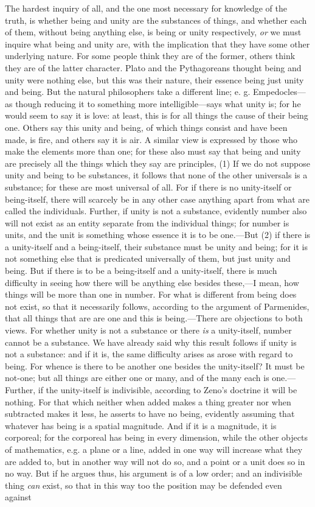 The hardest inquiry of all, and the one most necessary for knowledge of the truth, is whether being and unity are the substances of things, and whether each of them, without being anything else, is being or unity respectively, \emph{or} we must inquire what being and unity are, with the implication that they have some other underlying nature. For some people think they are of the former, others think they are of the latter character. Plato and the Pythagoreans thought being and unity were nothing else, but this was their nature, their essence being just unity and being. But the natural philosophers take a different line; e. g. Empedocles—as though reducing it to something more intelligible—says what unity is; for he would seem to say it is love: at least, this is for all things the cause of their being one. Others say this unity and being, of which things consist and have been made, is fire, and others say it is air. A similar view is expressed by those who make the elements more than one; for these also must say that being and unity are precisely all the things which they say are principles, (1) If we do not suppose unity and being to be substances, it follows that none of the other universals is a substance; for these are most universal of all. For if there is no unity-itself or being-itself, there will scarcely be in any other case anything apart from what are called the individuals. Further, if unity is not a substance, evidently number also will not exist as an entity separate from the individual things; for number is units, and the unit is something whose essence it is to be one.—But (2) if there is a unity-itself and a being-itself, their substance must be unity and being; for it is not something else that is predicated universally of them, but just unity and being. But if there is to be a being-itself and a unity-itself, there is much difficulty in seeing how there will be anything else besides these,—I mean, how things will be more than one in number. For what is different from being does not exist, so that it necessarily follows, according to the argument of Parmenides, that all things that are are one and this is being.—There are objections to both views. For whether unity is not a substance or there \emph{is} a unity-itself, number cannot be a substance. We have already said why this result follows if unity is not a substance: and if it is, the same difficulty arises as arose with regard to being. For whence is there to be another one besides the unity-itself? It must be not-one; but all things are either one or many, and of the many each is one.—Further, if the unity-itself is indivisible, according to Zeno's doctrine it will be nothing. For that which neither when added makes a thing greater nor when subtracted makes it less, he asserts to have no being, evidently assuming that whatever has being is a spatial magnitude. And if it is a magnitude, it is corporeal; for the corporeal has being in every dimension, while the other objects of mathematics, e.g. a plane or a line, added in one way will increase what they are added to, but in another way will not do so, and a point or a unit does so in no way. But if he argues thus, his argument is of a low order; and an indivisible thing \emph{can} exist, so that in this way too the position may be defended even against 